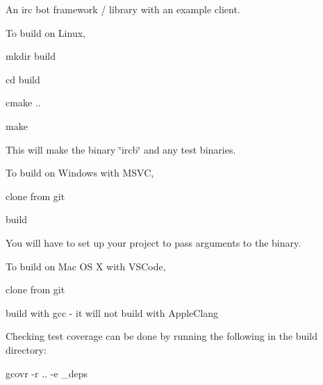 An irc bot framework / library with an example client.

To build on Linux,
\begin{DoxyEnumerate}
\item mkdir build
\item cd build
\item cmake ..
\item make
\end{DoxyEnumerate}

This will make the binary \char`\"{}ircb\char`\"{} and any test binaries.

To build on Windows with M\+S\+VC,
\begin{DoxyEnumerate}
\item clone from git
\item build
\end{DoxyEnumerate}

You will have to set up your project to pass arguments to the binary.

To build on Mac OS X with V\+S\+Code,
\begin{DoxyEnumerate}
\item clone from git
\item build with gcc -\/ it will not build with Apple\+Clang
\end{DoxyEnumerate}

Checking test coverage can be done by running the following in the build directory\+:

gcovr -\/r .. -\/e \+\_\+deps 